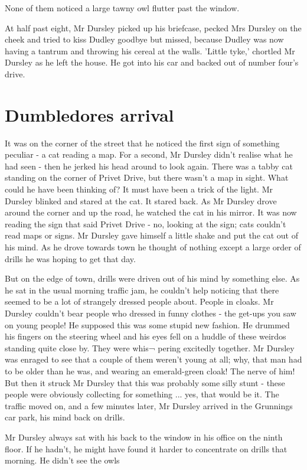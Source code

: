 \documentclass[twoside, openany]{report}
\begin{document}
None of them noticed a large tawny owl flutter past the window. 

At half past eight, Mr Dursley picked up his briefcase, pecked 
Mrs Dursley on the cheek and tried to kiss Dudley goodbye but 
missed, because Dudley was now having a tantrum and throwing 
his cereal at the walls. 'Little tyke,' chortled Mr Dursley as he left 
the house. He got into his car and backed out of number four's 
drive. 


\section{Dumbledores arrival}
It was on the corner of the street that he noticed the first sign 
of something peculiar - a cat reading a map. For a second, Mr 
Dursley didn't realise what he had seen - then he jerked his head 
around to look again. There was a tabby cat standing on the corner 
of Privet Drive, but there wasn't a map in sight. What could 
he have been thinking of? It must have been a trick of the light. 
Mr Dursley blinked and stared at the cat. It stared back. As Mr 
Dursley drove around the corner and up the road, he watched the 
cat in his mirror. It was now reading the sign that said Privet Drive 
- no, looking at the sign; cats couldn't read maps or signs. Mr 
Dursley gave himself a little shake and put the cat out of his 
mind. As he drove towards town he thought of nothing except a 
large order of drills he was hoping to get that day. 

But on the edge of town, drills were driven out of his mind by 
something else. As he sat in the usual morning traffic jam, he 
couldn't help noticing that there seemed to be a lot of strangely 
dressed people about. People in cloaks. Mr Dursley couldn't bear 
people who dressed in funny clothes - the get-ups you saw on 
young people! He supposed this was some stupid new fashion. He 
drummed his fingers on the steering wheel and his eyes fell on a 
huddle of these weirdos standing quite close by. They were whis¬ 
pering excitedly together. Mr Dursley was enraged to see that a 
couple of them weren't young at all; why, that man had to be older 
than he was, and wearing an emerald-green cloak! The nerve of 
him! But then it struck Mr Dursley that this was probably some 
silly stunt - these people were obviously collecting for something 
... yes, that would be it. The traffic moved on, and a few minutes 
later, Mr Dursley arrived in the Grunnings car park, his mind 
back on drills. 

Mr Dursley always sat with his back to the window in his office 
on the ninth floor. If he hadn't, he might have found it harder to 
concentrate on drills that morning. He didn't see the owls 
\end{document}
